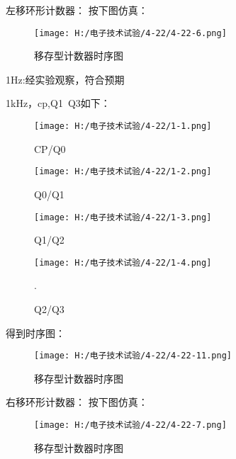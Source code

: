 \documentclass{article}
\begin{document}
左移环形计数器：
按下图仿真：
\begin{figure}[h]
    \centering
    \texttt{[image: H:/电子技术试验/4-22/4-22-6.png]}
    \caption{移存型计数器时序图} \label{fig:aa}
    \end{figure}
\newpage
1Hz:经实验观察，符合预期\par
1kHz，cp,Q1~Q3如下：
\begin{figure}[h]
    \begin{minipage}[t]{0.5\linewidth} %
      \centering   
      \texttt{[image: H:/电子技术试验/4-22/1-1.png]}   
      \caption{CP/Q0}   
      \label{fig:side:a}   
    \end{minipage}%
    \begin{minipage}[t]{0.5\linewidth}   
      \centering   
      \texttt{[image: H:/电子技术试验/4-22/1-2.png]}   
      \caption{Q0/Q1}   
      \label{fig:side:b}   
    \end{minipage}   
\end{figure}
    \begin{figure}[h]
        \begin{minipage}[t]{0.5\linewidth} %
          \centering   
          \texttt{[image: H:/电子技术试验/4-22/1-3.png]}   
          \caption{Q1/Q2}   
          \label{fig:side:a}   
        \end{minipage}%
        \begin{minipage}[t]{0.5\linewidth}   
          \centering   
          \texttt{[image: H:/电子技术试验/4-22/1-4.png]}   
          \caption{Q2/Q3}   
          \label{fig:side:b}   
        \end{minipage}   .
    \end{figure}
    \newpage
得到时序图：
\begin{figure}[h]
    \centering
    \texttt{[image: H:/电子技术试验/4-22/4-22-11.png]}
    \caption{移存型计数器时序图} \label{fig:aa}
    \end{figure}

右移环形计数器：
按下图仿真：
\begin{figure}[h]
    \centering
    \texttt{[image: H:/电子技术试验/4-22/4-22-7.png]}
    \caption{移存型计数器时序图} \label{fig:aa}
    \end{figure}
\end{document}
